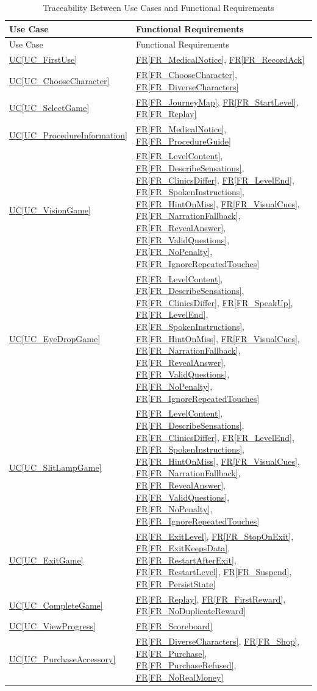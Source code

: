 \documentclass[12pt]{article}
\newcommand{\ucref}[1]{\hyperref[#1]{UC\ref*{#1}}}
\newcommand{\rref}[1]{\hyperref[#1]{FR\ref*{#1}}}
\begin{document}
\begin{longtable}{p{} p{}}

\caption{Traceability Between Use Cases and Functional Requirements}
\label{tab:SR2UC2FRtm}\\
\toprule
Use Case & Functional Requirements \\
\midrule
\endfirsthead
\toprule
Use Case & Functional Requirements \\
\midrule
\endhead
\ucref{UC_FirstUse} & \rref{FR_MedicalNotice}, \rref{FR_RecordAck} \\
\ucref{UC_ChooseCharacter} & \rref{FR_ChooseCharacter}, \rref{FR_DiverseCharacters} \\
\ucref{UC_SelectGame} & \rref{FR_JourneyMap}, \rref{FR_StartLevel}, \rref{FR_Replay} \\
\ucref{UC_ProcedureInformation} & \rref{FR_MedicalNotice}, \rref{FR_ProcedureGuide} \\
\ucref{UC_VisionGame} & \rref{FR_LevelContent}, \rref{FR_DescribeSensations}, \rref{FR_ClinicsDiffer}, \rref{FR_LevelEnd}, \rref{FR_SpokenInstructions}, \rref{FR_HintOnMiss}, \rref{FR_VisualCues}, \rref{FR_NarrationFallback}, \rref{FR_RevealAnswer}, \rref{FR_ValidQuestions}, \rref{FR_NoPenalty}, \rref{FR_IgnoreRepeatedTouches} \\
\ucref{UC_EyeDropGame} & \rref{FR_LevelContent}, \rref{FR_DescribeSensations}, \rref{FR_ClinicsDiffer}, \rref{FR_SpeakUp}, \rref{FR_LevelEnd}, \rref{FR_SpokenInstructions}, \rref{FR_HintOnMiss}, \rref{FR_VisualCues}, \rref{FR_NarrationFallback}, \rref{FR_RevealAnswer}, \rref{FR_ValidQuestions}, \rref{FR_NoPenalty}, \rref{FR_IgnoreRepeatedTouches} \\
\ucref{UC_SlitLampGame} & \rref{FR_LevelContent}, \rref{FR_DescribeSensations}, \rref{FR_ClinicsDiffer}, \rref{FR_LevelEnd}, \rref{FR_SpokenInstructions}, \rref{FR_HintOnMiss}, \rref{FR_VisualCues}, \rref{FR_NarrationFallback}, \rref{FR_RevealAnswer}, \rref{FR_ValidQuestions}, \rref{FR_NoPenalty}, \rref{FR_IgnoreRepeatedTouches} \\
\ucref{UC_ExitGame} & \rref{FR_ExitLevel}, \rref{FR_StopOnExit}, \rref{FR_ExitKeepsData}, \rref{FR_RestartAfterExit}, \rref{FR_RestartLevel}, \rref{FR_Suspend}, \rref{FR_PersistState} \\
\ucref{UC_CompleteGame} & \rref{FR_Replay}, \rref{FR_FirstReward}, \rref{FR_NoDuplicateReward} \\
\ucref{UC_ViewProgress} & \rref{FR_Scoreboard} \\
\ucref{UC_PurchaseAccessory} & \rref{FR_DiverseCharacters}, \rref{FR_Shop}, \rref{FR_Purchase}, \rref{FR_PurchaseRefused}, \rref{FR_NoRealMoney} \\

\end{longtable}
\end{document}
